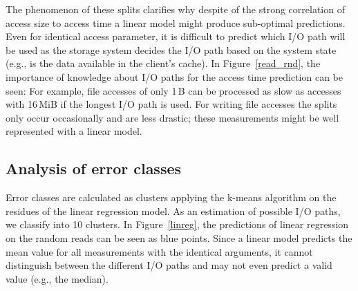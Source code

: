 \documentclass{superfri}
\begin{document}
	The phenomenon of these splits clarifies why despite of the strong correlation of access size to access time a linear model might produce sub-optimal predictions. 
	Even for identical access parameter, it is difficult to predict which I/O path will be used as the storage system decides the I/O path based on the system state (e.g., is the data available in the client's cache).
	In Figure~\ref{read_rnd}, the importance of knowledge about I/O paths for the  access time prediction can be seen: For example, file accesses of only 1\,B can be processed as slow as accesses with 16\,MiB if the longest I/O path is used.
	For writing file accesses the splits only occur occasionally and are less drastic; these measurements might be well represented with a linear model.
	
	\subsection{Analysis of error classes}
	Error classes are calculated as clusters applying the k-means algorithm on the residues of the linear regression model.
	As an estimation of possible I/O paths, we classify into 10 clusters.
	In Figure~\ref{linreg}, the predictions of linear regression on the random reads can be seen as blue points.
	Since a linear model predicts the mean value for all measurements with the identical arguments, it cannot distinguish between the different I/O paths and may not even predict a valid value (e.g., the median).
	
\end{document}
